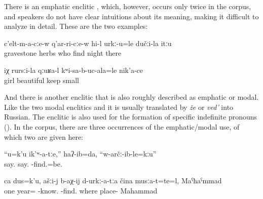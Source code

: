 There is an emphatic enclitic , which, however, occurs only twice in the corpus, and speakers do not have clear intuitions about its meaning, making it difficult to analyze in detail. These are the two examples:
%
\begin{exe}
	\ex	\label{ex:Among the graves, in the grass, who finds (him), at night minor}
	\gll	c'elt-m-a-cːe-w	q'ar-ri-cːe-w	hi-l	urkː-u=le	dučːi-la	itːu\\
		gravestone	herbs	who	find night	there\\
	\glt	{}

	\ex	\label{ex:‎(Look at) the way the girl is holding the child in her hands minor}
	\gll	iχ	rursːi-la qːuʁa-l	kʷi-sa-b-uc-ala=le	nik'a-ce\\
			girl	beautiful	keep	small\\
	\glt	{}
\end{exe}

And there is another enclitic  that is also roughly described as emphatic or modal. Like the two modal enclitics  and  it is usually translated by \textit{že} or \textit{ved'} into Russian. The enclitic is also used for the formation of specific indefinite pronouns (). In the corpus, there are three occurrences of the emphatic/modal use, of which two are given here:
  
\begin{exe}
	\ex	\label{I said, ``You said that they did not find him.''}
	\gll	``u=k'u	ik'ʷ-a-tːe,''	haʔ-ib=da,	``w-arčː-ib-le=kːu'' \\
			say.	say.		-find.=be. \\
	\glt	{}
	
		\ex	\label{One year, you should know it, where the places were, Mahammad.}
	\gll	ca	dus=k'u,	ašːi-j	b-aχ-ij	d-urkː-a-tːa	čina	musːa-t=te=l,	Maˁħaˁmmad\\
		one	year=		-know.	-find.		where	place-	Mahammad\\
	\glt	{}

\end{exe}


